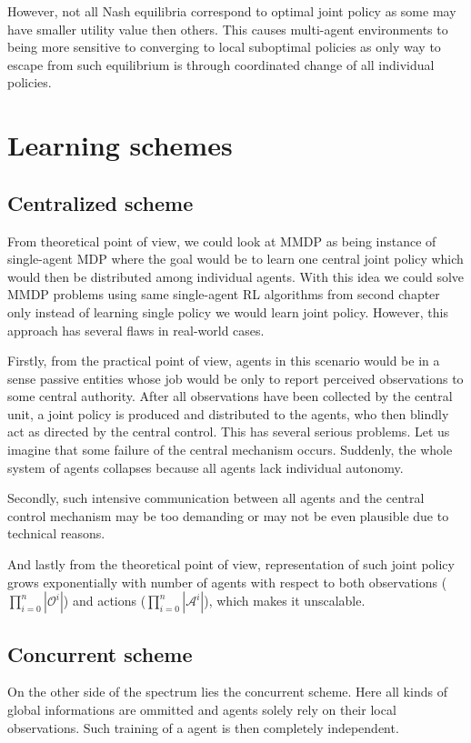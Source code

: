 However, not all Nash equilibria correspond to optimal joint policy as some may have smaller utility value then others.
This causes multi-agent environments to being more sensitive to converging to local suboptimal policies as only way to escape from such equilibrium is through coordinated change of all individual policies.




\section{Learning schemes}
\subsection*{Centralized scheme}\label{CentralScheme}
From theoretical point of view, we could look at MMDP as being instance of single-agent MDP where the goal would be to learn one central joint policy which would then be distributed among individual agents.
With this idea we could solve MMDP problems using same single-agent RL algorithms from second chapter only instead of learning single policy we would learn joint policy.
However, this approach has several flaws in real-world cases.

Firstly, from the practical point of view, agents in this scenario would be in a sense passive entities whose job would be only to report perceived observations to some central authority.
After all observations have been collected by the central unit, a joint policy is produced and distributed to the agents, who then blindly act as directed by the central control.
This has several serious problems.
Let us imagine that some failure of the central mechanism occurs.
Suddenly, the whole system of agents collapses because all agents lack individual autonomy.

Secondly, such intensive communication between all agents and the central control mechanism may be too demanding or may not be even plausible due to technical reasons.

And lastly from the theoretical point of view, representation of such joint policy grows exponentially with number of agents with respect to both observations ($\prod_{i=0}^{n}{|\mathcal{O}^i|}$)
and actions ($\prod_{i=0}^{n}|\mathcal{A}^i|$), which makes it unscalable.

\subsection*{Concurrent scheme}
On the other side of the spectrum lies the concurrent scheme.
Here all kinds of global informations are ommitted and agents solely rely on their local observations.
Such training of a agent is then completely independent.

